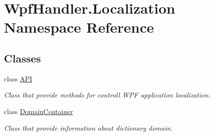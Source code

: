 \hypertarget{namespace_wpf_handler_1_1_localization}{}\section{Wpf\+Handler.\+Localization Namespace Reference}
\label{namespace_wpf_handler_1_1_localization}
\subsection*{Classes}
\begin{DoxyCompactItemize}
\item 
class \mbox{\hyperlink{class_wpf_handler_1_1_localization_1_1_a_p_i}{A\+PI}}
\begin{DoxyCompactList}\small\item\em Class that provide methods for controll W\+PF application localization. \end{DoxyCompactList}\item 
class \mbox{\hyperlink{class_wpf_handler_1_1_localization_1_1_domain_container}{Domain\+Container}}
\begin{DoxyCompactList}\small\item\em Class that provide information about dictionary domain. \end{DoxyCompactList}\end{DoxyCompactItemize}
